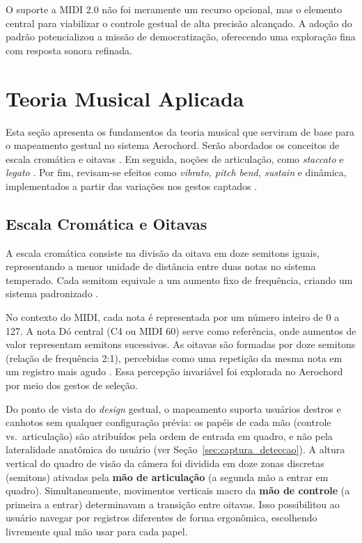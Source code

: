 O suporte a MIDI 2.0 não foi meramente um recurso opcional, mas o elemento central para viabilizar o controle gestual de alta precisão alcançado. A adoção do padrão potencializou a missão de democratização, oferecendo uma exploração fina com resposta sonora refinada.

\section{Teoria Musical Aplicada}
\label{sec:teoria_musical}

Esta seção apresenta os fundamentos da teoria musical que serviram de base para o mapeamento gestual no sistema Aerochord. Serão abordados os conceitos de escala cromática e oitavas \cite{benward2014music}. Em seguida, noções de articulação, como \textit{staccato} e \textit{legato} \cite{duckworth2015creative}. Por fim, revisam-se efeitos como \textit{vibrato, pitch bend, sustain} e dinâmica, implementados a partir das variações nos gestos captados \cite{Dodge1997}.

\subsection{Escala Cromática e Oitavas}
\label{sec:teoria_musical_escalas}

A escala cromática consiste na divisão da oitava em doze semitons iguais, representando a menor unidade de distância entre duas notas no sistema temperado. Cada semitom equivale a um aumento fixo de frequência, criando um sistema padronizado \cite{benward2014music}.

No contexto do MIDI, cada nota é representada por um número inteiro de 0 a 127. A nota Dó central (C4 ou MIDI 60) serve como referência, onde aumentos de valor representam semitons sucessivos. As oitavas são formadas por doze semitons (relação de frequência 2:1), percebidas como uma repetição da mesma nota em um registro mais agudo \cite{duckworth2015creative}. Essa percepção invariável foi explorada no Aerochord por meio dos gestos de seleção.

Do ponto de vista do \textit{design} gestual, o mapeamento suporta usuários destros e canhotos sem qualquer configuração prévia: os papéis de cada mão (controle vs.\ articulação) são atribuídos pela ordem de entrada em quadro, e não pela lateralidade anatômica do usuário (ver Seção~\ref{sec:captura_deteccao}). A altura vertical do quadro de visão da câmera foi dividida em doze zonas discretas (semitons) ativadas pela \textbf{mão de articulação} (a segunda mão a entrar em quadro). Simultaneamente, movimentos verticais macro da \textbf{mão de controle} (a primeira a entrar) determinavam a transição entre oitavas. Isso possibilitou ao usuário navegar por registros diferentes de forma ergonômica, escolhendo livremente qual mão usar para cada papel.

